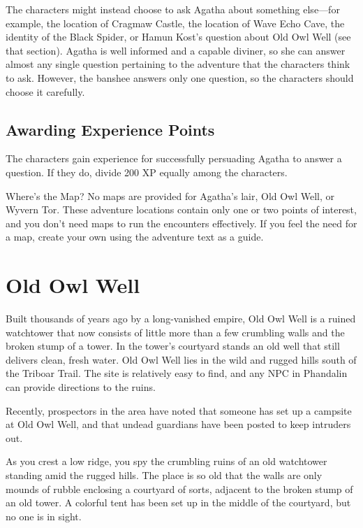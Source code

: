\documentclass[10pt,a4paper,twoside,bg=print,twocolumn,openany,nodeprecatedcode]{dndbook}
\begin{document}
The characters might instead choose to ask Agatha about something else—for example, the location of Cragmaw Castle, the location of Wave Echo Cave, the identity of the Black Spider, or Hamun Kost's question about Old Owl Well (see that section). Agatha is well informed and a capable diviner, so she can answer almost any single question pertaining to the adventure that the characters think to ask. However, the banshee answers only one question, so the characters should choose it carefully.

\subsection{Awarding Experience Points}
The characters gain experience for successfully persuading Agatha to answer a question. If they do, divide 200 XP equally among the characters.

\begin{DndSidebar}[float=!b]{Where's the Map?}
No maps are provided for Agatha's lair, Old Owl Well, or Wyvern Tor. These adventure locations contain only one or two points of interest, and you don't need maps to run the encounters effectively. If you feel the need for a map, create your own using the adventure text as a guide.



\end{DndSidebar}

\section{Old Owl Well}
Built thousands of years ago by a long-vanished empire, Old Owl Well is a ruined watchtower that now consists of little more than a few crumbling walls and the broken stump of a tower. In the tower's courtyard stands an old well that still delivers clean, fresh water. Old Owl Well lies in the wild and rugged hills south of the Triboar Trail. The site is relatively easy to find, and any NPC in Phandalin can provide directions to the ruins.

Recently, prospectors in the area have noted that someone has set up a campsite at Old Owl Well, and that undead guardians have been posted to keep intruders out.

\begin{DndReadAloud}{}
As you crest a low ridge, you spy the crumbling ruins of an old watchtower standing amid the rugged hills. The place is so old that the walls are only mounds of rubble enclosing a courtyard of sorts, adjacent to the broken stump of an old tower. A colorful tent has been set up in the middle of the courtyard, but no one is in sight.

\end{DndReadAloud}
\end{document}
